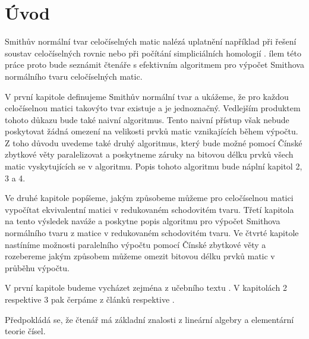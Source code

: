 \chapter*{Úvod}

Smithův normální tvar celočíselných matic nalézá uplatnění například při řešení
soustav celočíselných rovnic nebo při počítání simpliciálních homologií \cite{Simplic_Homo}.
ílem této práce proto bude seznámit čtenáře s efektivním
algoritmem pro výpočet Smithova normálního tvaru celočíselných matic.

V první kapitole definujeme Smithův normální tvar a ukážeme, že pro každou
celočíselnou matici takovýto tvar existuje a je jednoznačný. Vedlejším produktem
tohoto důkazu bude také naivní algoritmus.
Tento naivní přístup však nebude poskytovat žádná omezení na velikosti prvků
matic vznikajících během výpočtu. Z toho důvodu uvedeme také druhý algoritmus, který
bude možné pomocí Čínské zbytkové věty paralelizovat a poskytneme záruky na
bitovou délku prvků všech matic vyskytujících se v algoritmu.
Popis tohoto algoritmu bude náplní kapitol 2, 3 a 4.

Ve druhé kapitole popíšeme, jakým způsobeme můžeme pro celočíselnou matici
vypočítat ekvivalentní matici v redukovaném schodovitém tvaru. Třetí kapitola
na tento výsledek naváže a poskytne popis algoritmu pro výpočet Smithova
normálního tvaru z matice v redukovaném schodovitém tvaru. Ve čtvrté kapitole
nastíníme možnosti paralelního výpočtu pomocí Čínské zbytkové věty a rozebereme
jakým způsobem můžeme omezit bitovou délku prvků matic v průběhu výpočtu.

V první kapitole budeme vycházet zejména z učebního textu \cite{vokr}. V 
kapitolách 2 respektive 3 pak čerpáme z článků \cite{triang} respektive \cite{SNF_Arne}.

Předpokládá se, že čtenář má základní znalosti z lineární algebry a
elementární teorie čísel.

\cleardoublepage

